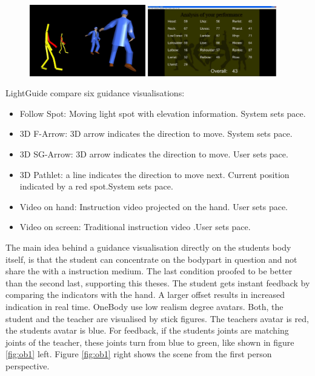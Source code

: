 \begin{figure}
	\centering
	\includegraphics[width=0.45\textwidth]{img/VRDanceTrainerPractice.png}
	\includegraphics[width=0.5\textwidth]{img/VRDanceTrainerScoreBoard.png}
	\caption{\todo \cite{Chan2011}}
	\label{fig:vrdt}
\end{figure}
LightGuide \cite{Sodhi2012} compare six guidance visualisations:
\begin{itemize}
	\item Follow Spot: Moving light spot with elevation information. System sets pace.
	\item 3D F-Arrow: 3D arrow indicates the direction to move. System sets pace.
	\item 3D SG-Arrow: 3D arrow indicates the direction to move. User sets pace.
	\item 3D Pathlet: a line indicates the direction to move next. Current position indicated by a red spot.System sets pace.
	\item Video on hand: Instruction video projected on the hand. User sets pace.
	\item Video on screen: Traditional instruction video .User sets pace.
\end{itemize}
The main idea behind a guidance visualisation directly on the students body itself, is that the student can concentrate on the bodypart in question and not share the  with a instruction medium. The last condition proofed to be better than the second last, supporting this theses.
The student gets instant feedback by comparing the indicators with the hand. A larger offset results in increased indication in real time.
OneBody \cite{Hoang2016} use low realism degree avatars. Both, the student and the teacher are visualised by stick figures. The teachers avatar is red, the students avatar is blue. For feedback, if the students joints are matching joints of the teacher, these joints turn from blue to green, like shown in figure \ref{fig:ob1} left. Figure \ref{fig:ob1} right shows the scene from the first person perspective.

